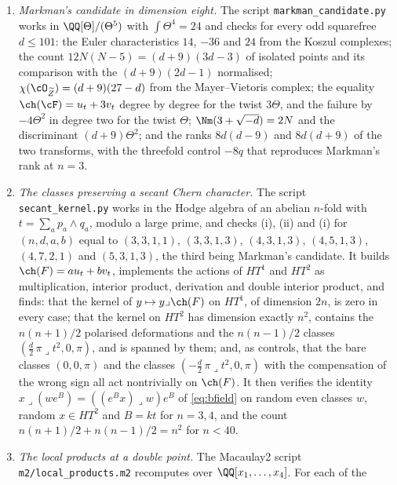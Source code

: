 \begin{enumerate}[label=\textup{(\Roman*)},leftmargin=*]
  eighteen configurations of item (XIV), finding $\dim\ker\sigma_{E}=15$ and
  $\dim(\ker\sigma_{E}\cap\image\operatorname{ev}_{E})=15$ in every case.
\item \emph{Markman's candidate in dimension eight.} The script
  \texttt{markman\_\allowbreak candidate.py} works in
  $\QQ[\Theta]/(\Theta^{5})$ with $\int\Theta^{4}=24$ and checks
   for every odd squarefree $d\le101$: the Euler
  characteristics $14$, $-36$ and $24$ from the Koszul complexes; the count
  $12N(N-5)=(d+9)(3d-3)$ of isolated points and its comparison with the
  $(d+9)(2d-1)$ normalised; $\chi(\cO_{\widetilde Z})=(d+9)(27-d)$ from the
  Mayer--Vietoris complex; the equality $\ch(\cF)=u_{t}+3v_{t}$ degree by
  degree for the twist $3\Theta$, and the failure by $-4\Theta^{2}$ in
  degree two for the twist $\Theta$; $\Nm(3+\sqrt{-d})=2N$ and the
  discriminant $(d+9)\Theta^{2}$; and the ranks $8d(d-9)$ and $8d(d+9)$ of
  the two transforms, with the threefold control $-8q$ that reproduces
  Markman's rank at $n=3$.
\item \emph{The classes preserving a secant Chern character.} The script
  \texttt{secant\_\allowbreak kernel.py} works in the Hodge algebra of an
  abelian $n$-fold with $t=\sum_{a}p_{a}\wedge q_{a}$, modulo a large prime,
  and checks (i), (ii) and (i) for
  $(n,d,a,b)$ equal to $(3,3,1,1)$, $(3,3,1,3)$, $(4,3,1,3)$, $(4,5,1,3)$,
  $(4,7,2,1)$ and $(5,3,1,3)$, the third being Markman's candidate. It builds
  $\ch(F)=au_{t}+bv_{t}$, implements the actions of $HT^{1}$ and $HT^{2}$ as
  multiplication, interior product, derivation and double interior product,
  and finds: that the kernel of $y\mapsto y\lrcorner\ch(F)$ on $HT^{1}$, of
  dimension $2n$, is zero in every case; that the kernel on $HT^{2}$ has
  dimension exactly $n^{2}$, contains the $n(n+1)/2$ polarised deformations
  and the $n(n-1)/2$ classes $(\tfrac d2\,\pi\lrcorner t^{2},0,\pi)$, and is
  spanned by them; and, as controls, that the bare classes $(0,0,\pi)$ and
  the classes $(-\tfrac d2\,\pi\lrcorner t^{2},0,\pi)$ with the compensation
  of the wrong sign all act nontrivially on $\ch(F)$. It then verifies the
  identity $x\lrcorner(we^{B})=((e^{B}x)\lrcorner w)e^{B}$ of
  \eqref{eq:bfield} on random even classes $w$, random $x\in HT^{2}$ and
  $B=kt$ for $n=3,4$, and the count $n(n+1)/2+n(n-1)/2=n^{2}$ for $n<40$.
\item \emph{The local products at a double point.} The Macaulay2 script
  \texttt{m2/local\_\allowbreak products.m2} recomputes
   over $\QQ[x_{1},\dots,x_{4}]$. For each of the

\end{enumerate}
